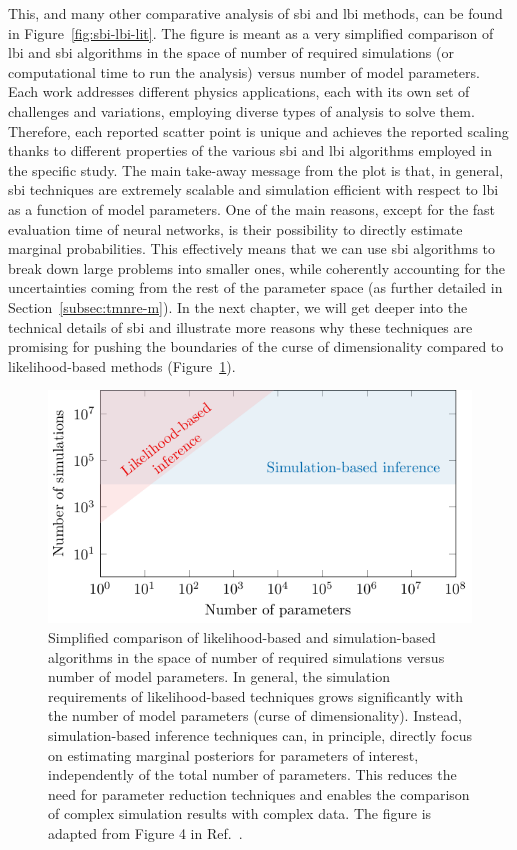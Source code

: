This, and many other comparative analysis of \gls*{sbi} and \gls*{lbi} methods, can be found in Figure~\ref{fig:sbi-lbi-lit}. The figure is meant as a very simplified comparison of \gls*{lbi} and \gls*{sbi} algorithms in the space of number of required simulations (or computational time to run the analysis) versus number of model parameters. Each work addresses different physics applications, each with its own set of challenges and variations, employing diverse types of analysis to solve them. Therefore, each reported scatter point is unique and achieves the reported scaling thanks to different properties of the various \gls*{sbi} and \gls*{lbi} algorithms employed in the specific study. The main take-away message from the plot is that, in general, \gls*{sbi} techniques are extremely scalable and simulation efficient with respect to \gls*{lbi} as a function of model parameters. One of the main reasons, except for the fast evaluation time of neural networks, is their possibility to directly estimate marginal probabilities. This effectively means that we can use \gls*{sbi} algorithms to break down large problems into smaller ones, while coherently accounting for the uncertainties coming from the rest of the parameter space (as further detailed in Section~\ref{subsec:tmnre-m}). In the next chapter, we will get deeper into the technical details of \gls*{sbi} and illustrate more reasons why these techniques are promising for pushing the boundaries of the curse of dimensionality compared to likelihood-based methods (Figure~\ref{fig:sbi-lbi-cost}).

\begin{figure}
    \centering
    \includegraphics[width=0.8\linewidth]{TikZ/curse_of_dim.pdf}
	\caption{Simplified comparison of likelihood-based and simulation-based algorithms in the space of number of required simulations versus number of model parameters. In general, the simulation requirements of likelihood-based techniques grows significantly with the number of model parameters (curse of dimensionality). Instead, simulation-based inference techniques can, in principle, directly focus on estimating marginal posteriors for parameters of interest, independently of the total number of parameters. This reduces the need for parameter reduction techniques and enables the comparison of complex simulation results with complex data. The figure is adapted from Figure 4 in Ref.~\cite{Boddy:2022knd}.}
    \label{fig:sbi-lbi-cost}
\end{figure}



